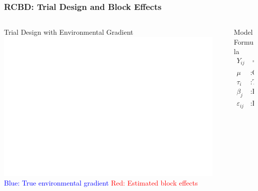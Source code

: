 \begin{frame}
    \frametitle{RCBD: Trial Design and Block Effects}
    \begin{columns}[T]
        \begin{column}{0.55\textwidth}
            \begin{block}{Trial Design with Environmental Gradient}
                \centering
                \includegraphics[width=0.95\textwidth]{Imgs/rcbd_trial_design_blocks.png}
                \vspace{0.5em}
                \scriptsize
                \textcolor{blue}{Blue: True environmental gradient}
                \textcolor{red}{Red: Estimated block effects}
            \end{block}
        \end{column}
        \begin{column}{0.45\textwidth}
            \begin{block}{Model Formula}
                \vspace{0.5em}
                \begin{align*}
                    Y_{ij} &= \mu + \tau_i + \beta_j + \varepsilon_{ij} \\
                    \mu &: \text{Overall mean} \\
                    \tau_i &: \text{Treatment effect} \\
                    \beta_j &: \text{Block effect} \\
                    \varepsilon_{ij} &: \text{Random error}
                \end{align*}
            \end{block}
        \end{column}
    \end{columns}
\end{frame}

